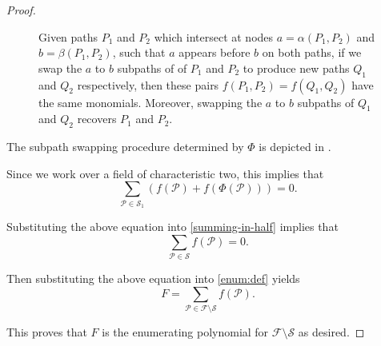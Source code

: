 \documentclass[11pt]{article}
\newcommand{\grp}[1]{\left(#1\right)}
\newcommand{\ca}{\mathcal}
\theoremstyle{definition}
\begin{document}
\begin{proof}
\begin{figure}[t]
    \caption{Given paths $P_1$ and $P_2$ which intersect at nodes $a = \alpha(P_1, P_2)$ and $b=\beta(P_1, P_2)$, such that $a$ appears before $b$ on both paths, if we swap the $a$ to $b$ subpaths of of $P_1$ and $P_2$ to produce new paths $Q_1$ and $Q_2$ respectively, then these pairs $f(P_1, P_2) = f(Q_1, Q_2)$ have the same monomials. 
    Moreover, swapping the $a$ to $b$ subpaths of $Q_1$ and $Q_2$ recovers $P_1$ and $P_2$.}
    \label{fig:subpath-swap}
\end{figure}

The subpath swapping procedure determined by $\Phi$ is depicted in .

Since we work over a field of characteristic two, this implies that 
\[\sum_{\ca{P}\in\ca{S}_1} \grp{f(\ca{P}) + f(\Phi(\ca{P}))} = 0.\]

Substituting the above equation into \cref{summing-in-half} implies that 
    \[\sum_{\ca{P}\in\ca{S}} f(\ca{P}) = 0.\]

Then substituting the above equation into \cref{enum:def} yields 
    \[F = \sum_{\ca{P}\in\ca{F}\setminus \ca{S}} f(\ca{P}).\]

This proves that $F$ is the enumerating polynomial for $\ca{F}\setminus\ca{S}$ as desired.
\end{proof}


\end{document}
